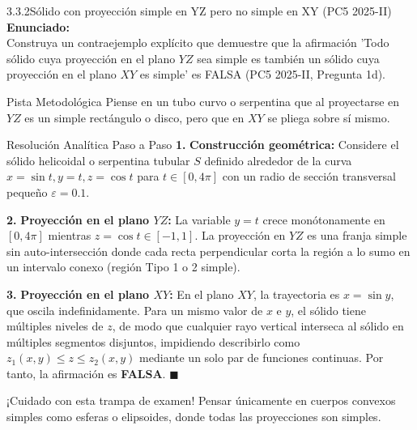 \documentclass[11pt,a4paper]{article}
\begin{document}
\begin{nivelbox}{3.3.2}{Sólido con proyección simple en YZ pero no simple en XY (PC5 2025-II)}
\textbf{Enunciado:}\\
Construya un contraejemplo explícito que demuestre que la afirmación 'Todo sólido cuya proyección en el plano $YZ$ sea simple es también un sólido cuya proyección en el plano $XY$ es simple' es FALSA (PC5 2025-II, Pregunta 1d).

\begin{observacionbox}{Pista Metodológica}
Piense en un tubo curvo o serpentina que al proyectarse en $YZ$ es un simple rectángulo o disco, pero que en $XY$ se pliega sobre sí mismo.
\end{observacionbox}

\begin{ejerciciobox}{Resolución Analítica Paso a Paso}
\smallskip\noindent\textbf{1.} \textbf{Construcción geométrica:}
Considere el sólido helicoidal o serpentina tubular $S$ definido alrededor de la curva $x = \sin t, y = t, z = \cos t$ para $t \in [0, 4\pi]$ con un radio de sección transversal pequeño $\varepsilon = 0.1$.

\smallskip\noindent\textbf{2.} \textbf{Proyección en el plano $YZ$:}
La variable $y = t$ crece monótonamente en $[0, 4\pi]$ mientras $z = \cos t \in [-1, 1]$. La proyección en $YZ$ es una franja simple sin auto-intersección donde cada recta perpendicular corta la región a lo sumo en un intervalo conexo (región Tipo 1 o 2 simple).

\smallskip\noindent\textbf{3.} \textbf{Proyección en el plano $XY$:}
En el plano $XY$, la trayectoria es $x = \sin y$, que oscila indefinidamente. Para un mismo valor de $x$ e $y$, el sólido tiene múltiples niveles de $z$, de modo que cualquier rayo vertical interseca al sólido en múltiples segmentos disjuntos, impidiendo describirlo como $z_1(x,y) \le z \le z_2(x,y)$ mediante un solo par de funciones continuas.
Por tanto, la afirmación es \textbf{FALSA}. $\blacksquare$
\end{ejerciciobox}

\begin{errorbox}{¡Cuidado con esta trampa de examen!}
Pensar únicamente en cuerpos convexos simples como esferas o elipsoides, donde todas las proyecciones son simples.
\end{errorbox}
\end{nivelbox}
\bigskip
\end{document}
